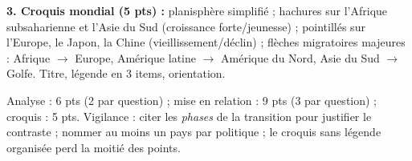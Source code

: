\documentclass[11pt]{article}
\begin{document}
\begin{corrige}
\begin{enumerate}
\end{enumerate}
\textbf{3. Croquis mondial (5 pts) :} planisphère simplifié ; hachures sur l'Afrique subsaharienne et l'Asie du Sud (croissance forte/jeunesse) ; pointillés sur l'Europe, le Japon, la Chine (vieillissement/déclin) ; flèches migratoires majeures : Afrique $\rightarrow$ Europe, Amérique latine $\rightarrow$ Amérique du Nord, Asie du Sud $\rightarrow$ Golfe. Titre, légende en 3 items, orientation.
\end{corrige}

\begin{attention}
Analyse : 6 pts (2 par question) ; mise en relation : 9 pts (3 par question) ; croquis : 5 pts. Vigilance : citer les \emph{phases} de la transition pour justifier le contraste ; nommer au moins un pays par politique ; le croquis sans légende organisée perd la moitié des points.
\end{attention}
\end{document}
